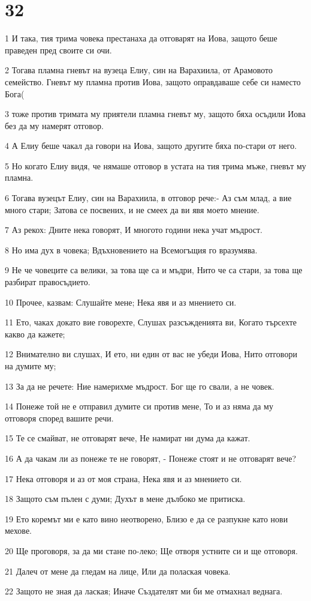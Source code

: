 \chapter{32}

\par 1 И така, тия трима човека престанаха да отговарят на Иова, защото беше праведен пред своите си очи.
\par 2 Тогава пламна гневът на вузеца Елиу, син на Варахиила, от Арамовото семейство. Гневът му пламна против Иова, защото оправдаваше себе си наместо Бога(
\par 3 тоже против тримата му приятели пламна гневът му, защото бяха осъдили Иова без да му намерят отговор.
\par 4 А Елиу беше чакал да говори на Иова, защото другите бяха по-стари от него.
\par 5 Но когато Елиу видя, че нямаше отговор в устата на тия трима мъже, гневът му пламна.
\par 6 Тогава вузецът Елиу, син на Варахиила, в отговор рече:- Аз съм млад, а вие много стари; Затова се посвених, и не смеех да ви явя моето мнение.
\par 7 Аз рекох: Дните нека говорят, И многото години нека учат мъдрост.
\par 8 Но има дух в човека; Вдъхновението на Всемогъщия го вразумява.
\par 9 Не че човеците са велики, за това ще са и мъдри, Нито че са стари, за това ще разбират правосъдието.
\par 10 Прочее, казвам: Слушайте мене; Нека явя и аз мнението си.
\par 11 Ето, чаках докато вие говорехте, Слушах разсъжденията ви, Когато търсехте какво да кажете;
\par 12 Внимателно ви слушах, И ето, ни един от вас не убеди Иова, Нито отговори на думите му;
\par 13 За да не речете: Ние намерихме мъдрост. Бог ще го свали, а не човек.
\par 14 Понеже той не е отправил думите си против мене, То и аз няма да му отговоря според вашите речи.
\par 15 Те се смайват, не отговарят вече, Не намират ни дума да кажат.
\par 16 А да чакам ли аз понеже те не говорят, - Понеже стоят и не отговарят вече?
\par 17 Нека отговоря и аз от моя страна, Нека явя и аз мнението си.
\par 18 Защото съм пълен с думи; Духът в мене дълбоко ме притиска.
\par 19 Ето коремът ми е като вино неотворено, Близо е да се разпукне като нови мехове.
\par 20 Ще проговоря, за да ми стане по-леко; Ще отворя устните си и ще отговоря.
\par 21 Далеч от мене да гледам на лице, Или да полаская човека.
\par 22 Защото не зная да лаская; Иначе Създателят ми би ме отмахнал веднага.

